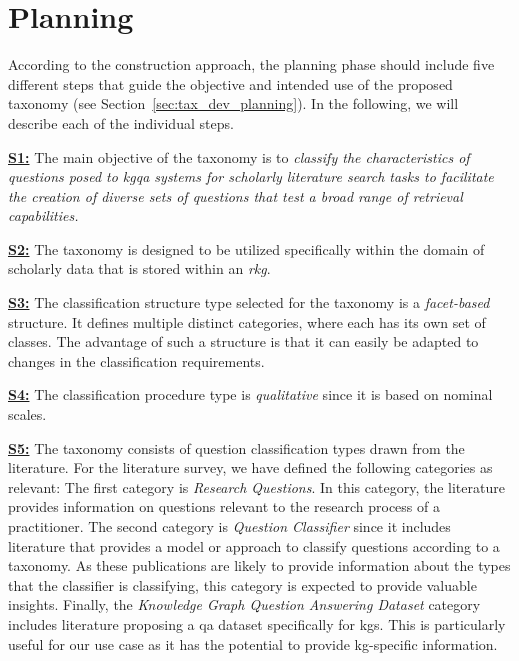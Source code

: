 
\section{Planning}
\label{sec:taxonomy_planning}

According to the construction approach, the planning phase should include five different steps that guide the objective and intended use of the proposed taxonomy (see Section~\ref{sec:tax_dev_planning}). In the following, we will describe each of the individual steps.

\hyperref[enum:step1]{\textbf{S1:}} The main objective of the taxonomy is to \emph{classify the characteristics of questions posed to \gls{kgqa} systems for scholarly literature search tasks to facilitate the creation of diverse sets of questions that test a broad range of retrieval capabilities.}

\hyperref[enum:step2]{\textbf{S2:}} The taxonomy is designed to be utilized specifically within the domain of scholarly data that is stored within an \emph{\gls{rkg}}.

\hyperref[enum:step3]{\textbf{S3:}} The classification structure type selected for the taxonomy is a \emph{facet-based} structure. It defines multiple distinct categories, where each has its own set of classes. The advantage of such a structure is that it can easily be adapted to changes in the classification requirements.

\hyperref[enum:step4]{\textbf{S4:}} The classification procedure type is \emph{qualitative} since it is based on nominal scales.

\hyperref[enum:step5]{\textbf{S5:}} The taxonomy consists of question classification types drawn from the literature. For the literature survey, we have defined the following categories as relevant: The first category is \emph{Research Questions}. In this category, the literature provides information on questions relevant to the research process of a practitioner. The second category is \emph{Question Classifier} since it includes literature that provides a model or approach to classify questions according to a taxonomy. As these publications are likely to provide information about the types that the classifier is classifying, this category is expected to provide valuable insights. Finally, the \emph{Knowledge Graph Question Answering Dataset} category includes literature proposing a \gls{qa} dataset specifically for \glspl{kg}. This is particularly useful for our use case as it has the potential to provide \gls{kg}-specific information.
